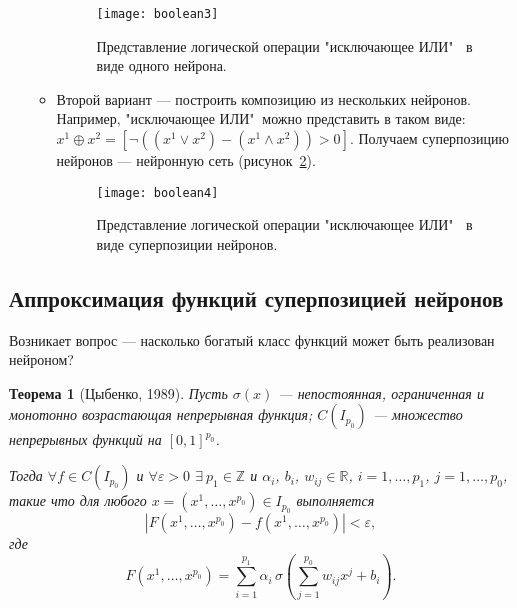 \documentclass[specialist, 12pt, 
subf, %
href, colorlinks=true,
substylefile = spbu.rtx,
]{disser}
\newtheorem{theorem}{Теорема}
\begin{document}
\begin{enumerate}
\begin{itemize}
	   		\begin{figure}[h]
	   	\begin{center}
	   		\begin{minipage}{0.75\linewidth}
	   			\texttt{[image: boolean3]}
	   			\caption{Представление логической операции "исключающее ИЛИ" $~$ в виде одного нейрона.}
	   			\label{bool3}
	   		\end{minipage}
	   	\end{center}
	   \end{figure}
   
   \item Второй вариант --- построить композицию из нескольких нейронов. Например, "исключающее ИЛИ"$~$ можно представить в таком виде: $x^1 \oplus x^2 = [\lnot((x^1\lor x^2) - (x^1 \wedge x^2))>0]$. Получаем суперпозицию нейронов --- нейронную сеть (рисунок~\ref{bool4}).
   
      \begin{figure}[h]
   	\begin{center}
   		\begin{minipage}{0.75\linewidth}
   			\texttt{[image: boolean4]}
   			\caption{Представление логической операции "исключающее ИЛИ" $~$ в виде суперпозиции нейронов.}
   			\label{bool4}
   		\end{minipage}
   	\end{center}
   \end{figure}
   
	\end{itemize}
	\end{enumerate}
	
	\subsection{Аппроксимация функций суперпозицией нейронов}
	
	Возникает вопрос --- насколько богатый класс функций может быть реализован нейроном? 

\begin{theorem}[Цыбенко, 1989]
	Пусть $\sigma(x)$ --- непостоянная, ограниченная и монотонно возрастающая непрерывная функция; $C(I_{p_0})$ --- множество непрерывных функций на $[0,1]^{p_0}$.
	
	Тогда $\forall f \in C(I_{p_0})$ и $\forall \varepsilon > 0$  $\exists ~p_1 \in \mathbb{Z}$ и  $\alpha_i$, $b_i$, $w_{ij} \in \mathbb{R}$, $i=1,\ldots,p_1$, $j=1,\ldots, p_0$, такие что для любого $x=(x^1, \ldots, x^{p_0}) \in I_{p_0}$ выполняется
		\begin{equation*}
	| F(x^1, \ldots, x^{p_0}) - f(x^1, \ldots, x^{p_0})| < \varepsilon,
		\end{equation*}
	где  \begin{equation*}
	F(x^1, \ldots, x^{p_0})=\sum_{i=1}^{p_1} \alpha_i \, \sigma \left(\sum_{j=1}^{p_0} w_{ij} x^j + b_i   \right).
\end{equation*}
\end{theorem}	
\end{document}
